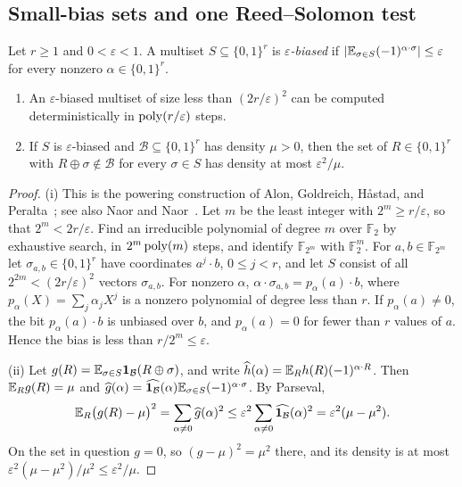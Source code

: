 \subsection{Small-bias sets and one Reed--Solomon test}

\begin{lemma}\label{earlier:r:lem:small-bias}
Let \(r\ge1\) and \(0<\varepsilon<1\). A multiset
\(S\subseteq\{0,1\}^r\) is \emph{\(\varepsilon\)-biased} if
\(\left|\mathbb E_{\sigma\in S}(-1)^{\alpha\cdot\sigma}\right|\le\varepsilon\) for every
nonzero \(\alpha\in\{0,1\}^r\).
\begin{enumerate}[label=(\roman*)]
\item An \(\varepsilon\)-biased multiset of size less than
\((2r/\varepsilon)^2\) can be computed deterministically in
\(\operatorname{poly}(r/\varepsilon)\) steps.
\item If \(S\) is \(\varepsilon\)-biased and
\(\mathcal B\subseteq\{0,1\}^r\) has density \(\mu>0\), then the set of
\(R\in\{0,1\}^r\) with \(R\oplus\sigma\notin\mathcal B\) for every
\(\sigma\in S\) has density at most \(\varepsilon^2/\mu\).
\end{enumerate}
\end{lemma}
\begin{proof}
(i) This is the powering construction of Alon, Goldreich, H\aa{}stad,
and Peralta~\cite{AGHP92}; see also Naor and Naor~\cite{NN93}. Let \(m\)
be the least integer with \(2^m\ge r/\varepsilon\), so that
\(2^m<2r/\varepsilon\). Find an irreducible polynomial of degree \(m\)
over \(\mathbb F_2\) by exhaustive search, in \(2^m\operatorname{poly}(m)\) steps, and
identify \(\mathbb F_{2^m}\) with \(\mathbb F_2^m\). For
\(a,b\in\mathbb F_{2^m}\) let \(\sigma_{a,b}\in\{0,1\}^r\) have
coordinates \(a^j\cdot b\), \(0\le j<r\), and let \(S\) consist of all
\(2^{2m}<(2r/\varepsilon)^2\) vectors \(\sigma_{a,b}\). For nonzero
\(\alpha\), \(\alpha\cdot\sigma_{a,b}=p_\alpha(a)\cdot b\), where
\(p_\alpha(X)=\sum_j\alpha_jX^j\) is a nonzero polynomial of degree less
than \(r\). If \(p_\alpha(a)\ne0\), the bit \(p_\alpha(a)\cdot b\) is
unbiased over \(b\), and \(p_\alpha(a)=0\) for fewer than \(r\) values
of \(a\). Hence the bias is less than \(r/2^m\le\varepsilon\).

(ii) Let \(g(R)=\mathbb E_{\sigma\in S}\mathbf 1_{\mathcal B}(R\oplus\sigma)\), and
write \(\widehat h(\alpha)=\mathbb E_R h(R)(-1)^{\alpha\cdot R}\). Then
\(\mathbb E_Rg(R)=\mu\) and
\(\widehat g(\alpha)=\widehat{\mathbf 1_{\mathcal B}}(\alpha)
\mathbb E_{\sigma\in S}(-1)^{\alpha\cdot\sigma}\). By Parseval,
\[
 \mathbb E_R\bigl(g(R)-\mu\bigr)^2=\sum_{\alpha\ne0}\widehat g(\alpha)^2
 \le\varepsilon^2\sum_{\alpha\ne0}\widehat{\mathbf 1_{\mathcal B}}(\alpha)^2
 =\varepsilon^2(\mu-\mu^2).
\]
On the set in question \(g=0\), so \((g-\mu)^2=\mu^2\) there, and its
density is at most \(\varepsilon^2(\mu-\mu^2)/\mu^2\le\varepsilon^2/\mu\).
\end{proof}

